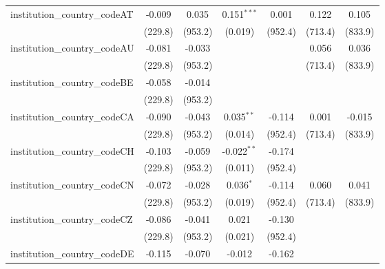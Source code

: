\begin{tabular}{lcccccc}
   institution\_country\_codeAT          & -0.009         & 0.035         & 0.151$^{***}$  & 0.001         & 0.122         & 0.105\\   
                                         & (229.8)        & (953.2)       & (0.019)        & (952.4)       & (713.4)       & (833.9)\\   
   institution\_country\_codeAU          & -0.081         & -0.033        &                &               & 0.056         & 0.036\\   
                                         & (229.8)        & (953.2)       &                &               & (713.4)       & (833.9)\\   
   institution\_country\_codeBE          & -0.058         & -0.014        &                &               &               &   \\   
                                         & (229.8)        & (953.2)       &                &               &               &   \\   
   institution\_country\_codeCA          & -0.090         & -0.043        & 0.035$^{**}$   & -0.114        & 0.001         & -0.015\\   
                                         & (229.8)        & (953.2)       & (0.014)        & (952.4)       & (713.4)       & (833.9)\\   
   institution\_country\_codeCH          & -0.103         & -0.059        & -0.022$^{**}$  & -0.174        &               &   \\   
                                         & (229.8)        & (953.2)       & (0.011)        & (952.4)       &               &   \\   
   institution\_country\_codeCN          & -0.072         & -0.028        & 0.036$^{*}$    & -0.114        & 0.060         & 0.041\\   
                                         & (229.8)        & (953.2)       & (0.019)        & (952.4)       & (713.4)       & (833.9)\\   
   institution\_country\_codeCZ          & -0.086         & -0.041        & 0.021          & -0.130        &               &   \\   
                                         & (229.8)        & (953.2)       & (0.021)        & (952.4)       &               &   \\   
   institution\_country\_codeDE          & -0.115         & -0.070        & -0.012         & -0.162        &               &   \\   

\end{tabular}
